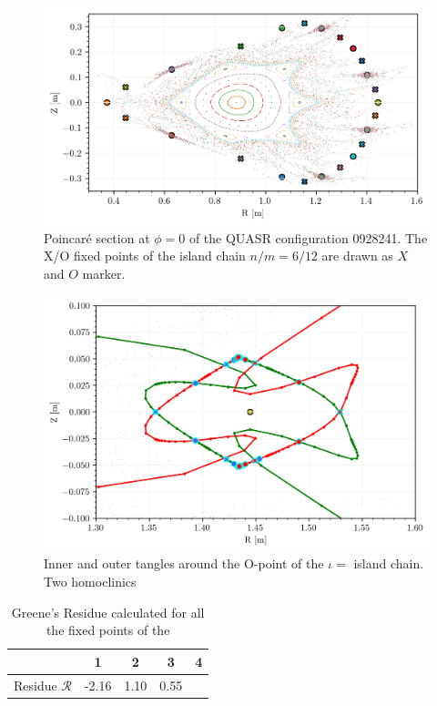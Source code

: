 \begin{figure}[H]
    \centering
    \includegraphics{images/quasrs/fixedpoint_ox_0928241.png}
    \caption{Poincaré section at $\phi=0$ of the QUASR configuration 0928241. The X/O fixed points of the island chain $n/m = 6/12$ are drawn as $X$ and $O$ marker.}
    \label{fig:p-0928241}
\end{figure}


\begin{figure}[H]
    \centering
    \includegraphics{images/quasrs/outer_0928241.png}
    \caption{Inner and outer tangles around the O-point of the $\iota = $ island chain. Two homoclinics }
    \label{fig:turn-0928241}
\end{figure}

\begin{table}[H]
    \centering
    \begin{tabular}{c|c|c|c|c}
         & 1 & 2 & 3 & 4 \\
         \hline Residue $\mathcal{R}$ & -2.16 & 1.10 & 0.55
    \end{tabular}
    \caption{Greene's Residue calculated for all the fixed points of the }
    \label{tab:greenes}
\end{table}

